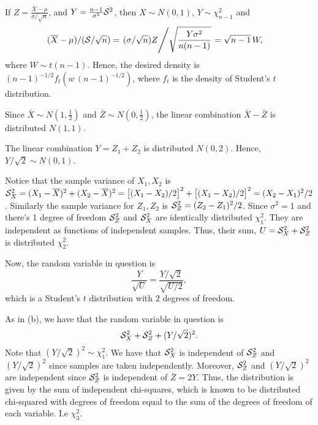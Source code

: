 \documentclass{stat_homework}
\begin{document}

If $Z = \frac{\bar X - \mu}{\sigma/\sqrt n}$, and $Y = \frac{n-1}{\sigma^2} \mathcal S^2$, then $X \sim N(0,1)$, $Y \sim \chi^2_{n-1}$ and
\begin{align*}
  (\overline X - \mu)/(\mathcal S/\sqrt n) 
  &= \left. (\sigma/\sqrt n) Z \middle/ \sqrt{\frac{Y\sigma^2}{n(n-1)}} \right. 
  = \sqrt{n-1} \, W,
\end{align*}
where $W \sim t(n-1)$.  Hence, the desired density is $(n-1)^{-1/2}f_t(w \,(n-1)^{-1/2})$, where $f_t$ is the density of Student's $t$ distribution. 

\newpage



Since $\bar X\sim N(1,\frac 12)$ and $\bar Z \sim N(0,\frac 12)$, the linear combination $\bar X - \bar Z$ is distributed $N(1,1)$.


The linear combination $Y = Z_1 + Z_2$ is distributed $N(0,2)$. Hence, $Y/\sqrt2 \sim N(0,1)$.

Notice that the sample variance of $X_1,X_2$ is $\mathcal S_X^2=(X_1 - \overline X)^2 + (X_2 - \overline X)^2 = \big[(X_1 - X_2)/2\big]^2+\big[(X_1 - X_2)/2\big]^2 = (X_2 - X_1)^2/2$.  Similarly the sample variance for $Z_1,Z_2$ is $\mathcal S_Z^2=(Z_2 - Z_1)^2/2$. Since $\sigma^2=1$ and there's 1 degree of freedom $\mathcal S^2_Z$ and $\mathcal S^2_X$ are identically distributed $\chi^2_1$. They are independent as functions of independent samples.  Thus, their sum, $U = \mathcal S_X^2 + \mathcal S_Z^2$ is distributed $\chi^2_2$. 

Now, the random variable in question is
$$
  \frac{Y}{\sqrt{U}} = \frac{Y/\sqrt 2}{\sqrt{U/2}},
$$
which is a Student's $t$ distribution with $2$ degrees of freedom.


As in (b), we have that the random variable in question is
$$
  \mathcal S_X^2 + \mathcal S_Z^2 + (Y/\sqrt2)^2.
$$
Note that $(Y/\sqrt2)^2\sim\chi^2_1$.  We have that $\mathcal S_X^2$ is independent of $\mathcal S_Z^2$ and $(Y/\sqrt 2)^2$ since samples are taken independently.  Moreover, $\mathcal S_Z^2$ and $(Y/\sqrt2)^2$ are independent since $\mathcal S_Z^2$ is independent of $\bar Z = 2 Y$.  Thus, the distribution is given by the sum of independent chi-squares, which is known to be distributed chi-squared with degrees of freedom equal to the sum of the degrees of freedom of each variable.  I.e $\chi^2_3$. 
\end{document}
